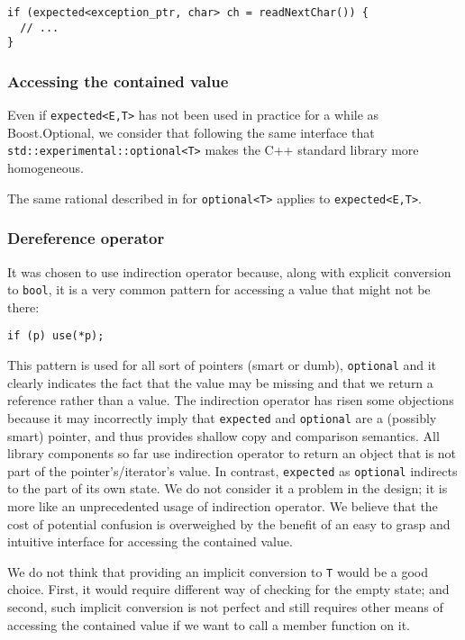 \documentclass[a4paper,10pt]{article}
\newcommand{\cpp}[1]{\lstinline{#1}}
\begin{document}
\begin{lstlisting}
if (expected<exception_ptr, char> ch = readNextChar()) {
  // ...
}
\end{lstlisting}


\subsubsection{Accessing the contained value}

Even if \cpp{expected<E,T>} has not been used in practice for a while as Boost.Optional, we consider that following the same interface that \cpp{std::experimental::optional<T>} makes the C++ standard library more homogeneous. 

The same rational described in \cite{OptionalRev4} for \cpp{optional<T>} applies to \cpp{expected<E,T>}. 

\subsubsection{Dereference operator}

It was chosen to use indirection operator because, along with explicit conversion to \cpp{bool}, it is a very common pattern for accessing a value that might not be there:

\begin{lstlisting}
if (p) use(*p);
\end{lstlisting}

This pattern is used for all sort of pointers (smart or dumb), \cpp{optional} and it clearly indicates the fact that the value may be missing and that we return a reference rather than a value. The indirection operator has risen some objections because it may incorrectly imply that \cpp{expected} and \cpp{optional} are a (possibly smart) pointer, and thus provides shallow copy and comparison semantics. All library components so far use indirection operator to return an object that is not part of the pointer's/iterator's value. In contrast, \cpp{expected} as \cpp{optional} indirects to the part of its own state. We do not consider it a problem in the design; it is more like an unprecedented usage of indirection operator. We believe that the cost of potential confusion is overweighed by the benefit of an easy to grasp and intuitive interface for accessing the contained value.

We do not think that providing an implicit conversion to \cpp{T} would be a good choice. First, it would require different way of checking for the empty state; and second, such implicit conversion is not perfect and still requires other means of accessing the contained value if we want to call a member function on it.
\end{document}
